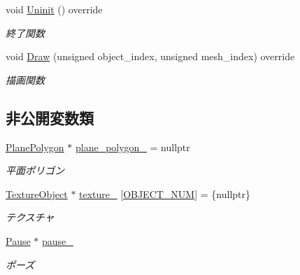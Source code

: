 \begin{DoxyCompactItemize}
void \mbox{\hyperlink{class_pause_draw_a2723bac62bfe180cc8af3c68948db376}{Uninit}} () override
\begin{DoxyCompactList}\small\item\em 終了関数 \end{DoxyCompactList}\item 
void \mbox{\hyperlink{class_pause_draw_a84a0b8965acd5d9a6021d4a4776a770f}{Draw}} (unsigned object\+\_\+index, unsigned mesh\+\_\+index) override
\begin{DoxyCompactList}\small\item\em 描画関数 \end{DoxyCompactList}\end{DoxyCompactItemize}
\subsection*{非公開変数類}
\begin{DoxyCompactItemize}
\item 
\mbox{\hyperlink{class_plane_polygon}{Plane\+Polygon}} $\ast$ \mbox{\hyperlink{class_pause_draw_ab2b509f30e00ae7c4250b0c50a21c1c6}{plane\+\_\+polygon\+\_\+}} = nullptr
\begin{DoxyCompactList}\small\item\em 平面ポリゴン \end{DoxyCompactList}\item 
\mbox{\hyperlink{class_texture_object}{Texture\+Object}} $\ast$ \mbox{\hyperlink{class_pause_draw_a53aa88e9354415d77212221e361a1f99}{texture\+\_\+}} \mbox{[}\mbox{\hyperlink{class_pause_draw_a28303189f2f9cf000bd8f2ca9d55ee05}{O\+B\+J\+E\+C\+T\+\_\+\+N\+UM}}\mbox{]} = \{nullptr\}
\begin{DoxyCompactList}\small\item\em テクスチャ \end{DoxyCompactList}\item 
\mbox{\hyperlink{class_pause}{Pause}} $\ast$ \mbox{\hyperlink{class_pause_draw_a7ee983174375f6437d39a628fe30a750}{pause\+\_\+}}
\begin{DoxyCompactList}\small\item\em ポーズ \end{DoxyCompactList}\end{DoxyCompactItemize}
